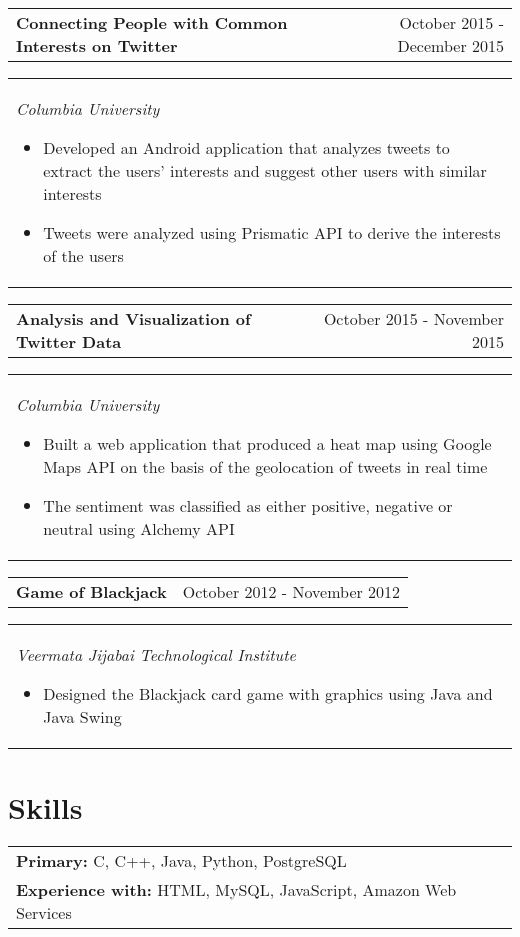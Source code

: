 \documentclass[margin,line]{res}
\begin{document}
\begin{resume}
\begin{tabular}{p{3.875in} r}
\bf Connecting People with Common Interests on Twitter & October 2015 - December 2015
\end{tabular}
\begin{tabular} {p{5.92in}}
\it Columbia University 
\begin{itemize}
    \item \textup{Developed an Android application that analyzes tweets to extract the users' interests and suggest other users with similar interests}
    \item \textup{Tweets were analyzed using Prismatic API to derive the interests of the users}
\end{itemize}
\end{tabular}

\begin{tabular}{p{3.875in} r}
\bf Analysis and Visualization of Twitter Data & October 2015 - November 2015
\end{tabular}
\begin{tabular}{p{5.92in}}
\it Columbia University
\begin{itemize}
    \item \textup{Built a web application that produced a heat map using Google Maps API on the basis of the geolocation of tweets in real time}
    \item \textup{The sentiment was classified as either positive, negative or neutral using Alchemy API}
\end{itemize}
\end{tabular}

\begin{tabular}{p{3.875in} r}
\bf Game of Blackjack   & October 2012 - November 2012
\end{tabular}
\begin{tabular} {p{5.92in}}
\it Veermata Jijabai Technological Institute
\begin{itemize}
    \item \textup{Designed the Blackjack card game with graphics using Java and Java Swing }
\end{itemize}
\end{tabular}

\section{\sc\bf Skills}
\begin{tabular}{p{5.92in}}
{\bf Primary:} C, C++, Java, Python, PostgreSQL\\
{\bf Experience with:} HTML, MySQL, JavaScript, Amazon Web Services
\end{tabular}


\end{resume}
\end{document}
